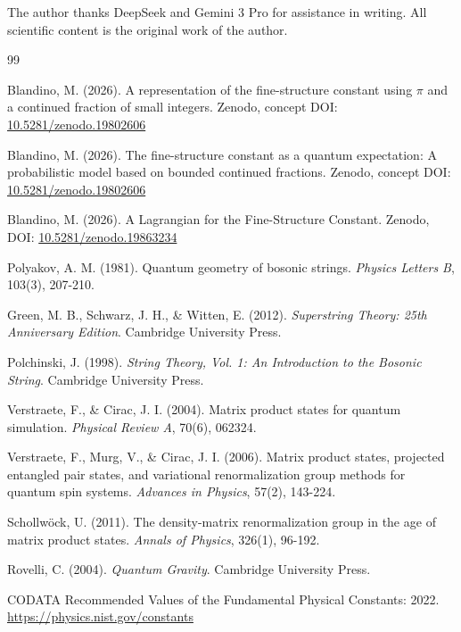 \documentclass[12pt]{article}
\begin{document}
The author thanks DeepSeek and Gemini 3 Pro for assistance in writing.
All scientific content is the original work of the author.

\begin{thebibliography}{99}

Blandino, M. (2026). A representation of the fine-structure constant using
$\pi$ and a continued fraction of small integers.
Zenodo, concept DOI: \href{https://doi.org/10.5281/zenodo.19802606}{10.5281/zenodo.19802606}

Blandino, M. (2026). The fine-structure constant as a quantum expectation:
A probabilistic model based on bounded continued fractions.
Zenodo, concept DOI: \href{https://doi.org/10.5281/zenodo.19802606}{10.5281/zenodo.19802606}

Blandino, M. (2026). A Lagrangian for the Fine-Structure Constant.
Zenodo, DOI: \href{https://doi.org/10.5281/zenodo.19863234}{10.5281/zenodo.19863234}

Polyakov, A. M. (1981). Quantum geometry of bosonic strings.
\textit{Physics Letters B}, 103(3), 207-210.

Green, M. B., Schwarz, J. H., \& Witten, E. (2012).
\textit{Superstring Theory: 25th Anniversary Edition}.
Cambridge University Press.

Polchinski, J. (1998). \textit{String Theory, Vol. 1: An Introduction to
the Bosonic String}. Cambridge University Press.

Verstraete, F., \& Cirac, J. I. (2004). Matrix product states for quantum
simulation. \textit{Physical Review A}, 70(6), 062324.

Verstraete, F., Murg, V., \& Cirac, J. I. (2006). Matrix product states,
projected entangled pair states, and variational renormalization group methods
for quantum spin systems. \textit{Advances in Physics}, 57(2), 143-224.

Schollwöck, U. (2011). The density-matrix renormalization group in the age of
matrix product states. \textit{Annals of Physics}, 326(1), 96-192.

Rovelli, C. (2004). \textit{Quantum Gravity}. Cambridge University Press.

CODATA Recommended Values of the Fundamental Physical Constants: 2022.
\url{https://physics.nist.gov/constants}

\end{thebibliography}
\end{document}
